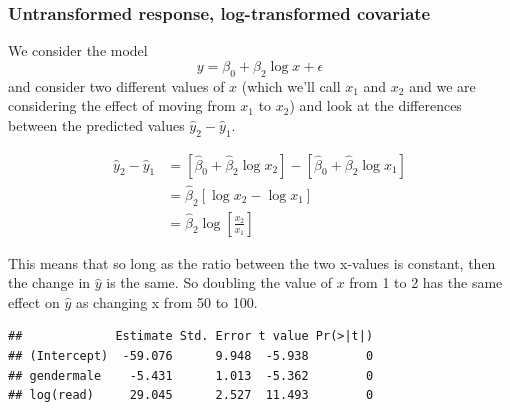 \documentclass[]{book}
\newenvironment{Shaded}{\begin{snugshade}}{\end{snugshade}}
\newcommand{\KeywordTok}[1]{\textcolor[rgb]{0.13,0.29,0.53}{\textbf{{#1}}}}
\newcommand{\DataTypeTok}[1]{\textcolor[rgb]{0.13,0.29,0.53}{{#1}}}
\newcommand{\DecValTok}[1]{\textcolor[rgb]{0.00,0.00,0.81}{{#1}}}
\newcommand{\StringTok}[1]{\textcolor[rgb]{0.31,0.60,0.02}{{#1}}}
\newcommand{\CommentTok}[1]{\textcolor[rgb]{0.56,0.35,0.01}{\textit{{#1}}}}
\newcommand{\NormalTok}[1]{{#1}}
\theoremstyle{definition}
\theoremstyle{definition}
\theoremstyle{remark}
\begin{document}
\subsubsection{Untransformed response, log-transformed
covariate}\label{untransformed-response-log-transformed-covariate}

We consider the model \[y=\beta_{0}+\beta_{2}\log x+\epsilon\] and
consider two different values of \(x\) (which we'll call \(x_{1}\) and
\(x_{2}\) and we are considering the effect of moving from \(x_{1}\) to
\(x_{2}\)) and look at the differences between the predicted values
\(\hat{y}_2 - \hat{y}_1\).

\[\begin{aligned}
\hat{y}_{2}-\hat{y}_{1} 
  & =   \left[\hat{\beta}_{0}+\hat{\beta}_{2}\log x_{2}\right]-\left[\hat{\beta}_{0}+\hat{\beta}_{2}\log x_{1}\right] \\
    & = \hat{\beta}_{2}\left[\log x_{2}-\log x_{1}\right] \\
    & = \hat{\beta}_{2}\log\left[\frac{x_{2}}{x_{1}}\right]
    \end{aligned}\]

This means that so long as the ratio between the two x-values is
constant, then the change in \(\hat{y}\) is the same. So doubling the
value of \(x\) from 1 to 2 has the same effect on \(\hat{y}\) as
changing x from 50 to 100.

\begin{Shaded}
\end{Shaded}

\begin{verbatim}
##             Estimate Std. Error t value Pr(>|t|)
## (Intercept)  -59.076      9.948  -5.938        0
## gendermale    -5.431      1.013  -5.362        0
## log(read)     29.045      2.527  11.493        0
\end{verbatim}

\begin{Shaded}
\end{Shaded}
\end{document}
